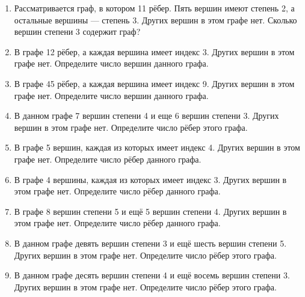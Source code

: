 \documentclass[a4paper,12pt]{article}
\newcommand{\taskspace}{\par\vspace{0.42cm}}
\begin{document}
\begin{enumerate}[resume]
\taskspace

\item Рассматривается граф, в котором 11 рёбер. Пять вершин имеют степень 2, а остальные вершины --- степень 3. Других вершин в этом графе нет. Сколько вершин степени 3 содержит граф?

\taskspace

\item В графе 12 рёбер, а каждая вершина имеет индекс 3. Других вершин в этом графе нет. Определите число вершин данного графа.

\taskspace

\item В графе 45 рёбер, а каждая вершина имеет индекс 9. Других вершин в этом графе нет. Определите число вершин данного графа.

\taskspace

\item В данном графе 7 вершин степени 4 и еще 6 вершин степени 3. Других вершин в этом графе нет. Определите число рёбер этого графа.

\taskspace

\item В графе 5 вершин, каждая из которых имеет индекс 4. Других вершин в этом графе нет. Определите число рёбер данного графа.

\taskspace

\item В графе 4 вершины, каждая из которых имеет индекс 3. Других вершин в этом графе нет. Определите число рёбер данного графа.

\taskspace

\item В графе 8 вершин степени 5 и ещё 5 вершин степени 4. Других вершин в этом графе нет. Определите число рёбер данного графа.

\taskspace

\item В данном графе девять вершин степени 3 и ещё шесть вершин степени 5. Других вершин в этом графе нет. Определите число рёбер этого графа.

\taskspace

\item В данном графе десять вершин степени 4 и ещё восемь вершин степени 3. Других вершин в этом графе нет. Определите число рёбер этого графа.


\end{enumerate}
\end{document}
